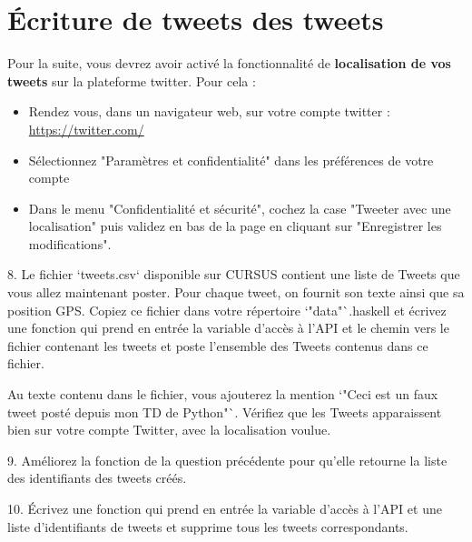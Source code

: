 \documentclass[11pt,a4paper]{article}
\begin{document}
\section{Écriture de tweets des tweets}

Pour la suite, vous devrez avoir activé la fonctionnalité de \textbf{localisation de vos tweets} sur la plateforme twitter. Pour cela :

\begin{itemize}
\item Rendez vous, dans un navigateur web, sur votre compte twitter : \url{https://twitter.com/}
\item  Sélectionnez "Paramètres et confidentialité" dans les préférences de votre compte
\item  Dans le menu "Confidentialité et sécurité", cochez la case "Tweeter avec une localisation" puis validez en bas de la page en cliquant sur "Enregistrer les modifications".
\end{itemize}

8. Le fichier `tweets.csv` disponible sur CURSUS contient une liste de Tweets que vous allez maintenant poster. Pour chaque tweet, on fournit son texte ainsi que sa position GPS. Copiez ce fichier dans votre répertoire `"data"`{.haskell} et écrivez une fonction qui prend en entrée la variable d'accès à l'API et le chemin vers le fichier contenant les tweets et poste l'ensemble des Tweets contenus dans ce fichier.

Au texte contenu dans le fichier, vous ajouterez la mention `"Ceci est un faux tweet posté depuis mon TD de Python"`. Vérifiez que les Tweets apparaissent bien sur votre compte Twitter, avec la localisation voulue.



9. Améliorez la fonction de la question précédente pour qu'elle retourne la liste des identifiants des tweets créés.



10. Écrivez une fonction qui prend en entrée la variable d'accès à l'API et une liste d'identifiants de tweets et supprime tous les tweets correspondants.
\end{document}
